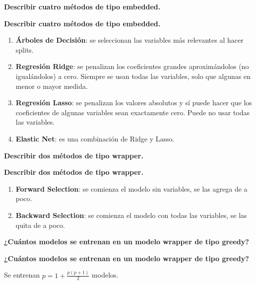 \documentclass[10pt]{memoir}
\begin{document}
\clearpage
\begin{center}
	\textbf{\Large Describir cuatro métodos de tipo embedded.} \\
\end{center}

\clearpage
\begin{center}
	\textbf{\Large Describir cuatro métodos de tipo embedded.} \\
\end{center}
\begin{enumerate}
	\item \textbf{Árboles de Decisión}: se seleccionan las variables más relevantes al hacer splits.
	\item \textbf{Regresión Ridge}: se penalizan los coeficientes grandes aproximándolos (no igualándolos) a cero. Siempre se usan todas las variables, solo que algunas en menor o mayor medida.
	\item \textbf{Regresión Lasso}: se penalizan los valores absolutos y sí puede hacer que los coeficientes de algunas variables sean exactamente cero. Puede no usar todas las variables.
	\item \textbf{Elastic Net}: es una combinación de Ridge y Lasso.
\end{enumerate}

\clearpage
\begin{center}
	\textbf{\Large Describir dos métodos de tipo wrapper.} \\
\end{center}

\clearpage
\begin{center}
	\textbf{\Large Describir dos métodos de tipo wrapper.} \\
\end{center}
\begin{enumerate}
	\item \textbf{Forward Selection}: se comienza el modelo sin variables, se las agrega de a poco.
	\item \textbf{Backward Selection}: se comienza el modelo con todas las variables, se las quita de a poco.
\end{enumerate}

\clearpage
\begin{center}
	\textbf{\Large ¿Cuántos modelos se entrenan en un modelo wrapper de tipo greedy?} \\
\end{center}

\clearpage
\begin{center}
	\textbf{\Large ¿Cuántos modelos se entrenan en un modelo wrapper de tipo greedy?} \\
\end{center}
\noindent Se entrenan \(p = 1 + \frac{p(p+1)}{2}\) modelos.
\end{document}
